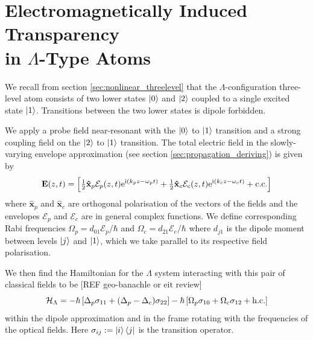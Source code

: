 \section[Electromagnetically Induced Transparency in $\Lambda$-Type Atoms]
  {Electromagnetically Induced Transparency\\ in $\Lambda$-Type Atoms}
  \label{sec:polaritons_eit}

    We recall from section \ref{sec:nonlinear_threelevel} that the
    $\Lambda$-configuration three-level atom consists of two lower states
    $\Ket{0}$ and $\Ket{2}$ coupled to a single excited state $\Ket{1}$.
    Transitions between the two lower states is dipole forbidden.

    We apply a probe field near-resonant with the $\Ket{0}$ to $\Ket{1}$
    transition and a strong coupling field on the $\Ket{2}$ to $\Ket{1}$
    transition. The total electric field in the slowly-varying envelope
    approximation (see section \ref{sec:propagation_deriving}) is given by 
    \begin{equation}
      \mathbf{E}(z,t) = \left[ \tfrac{1}{2} \mathbf{\hat{x}}_p 
        \mathcal{E}_p(z,t) \mathrm{e}^{\mathrm{i}(k_p z - \omega_p t)} + 
        \tfrac{1}{2} \mathbf{\hat{x}}_c \mathcal{E}_c(z,t) \mathrm{e}^{\mathrm{i}(k_c z -
        \omega_c t)} + \mathrm{c.c.} \right]
      \label{eqn:lambda_field}
    \end{equation}
   where $\mathbf{\hat{x}}_p$ and $\mathbf{\hat{x}}_c$ are orthogonal
    polarisation of the vectors of the fields and the envelopes $\mathcal{E}_p$
    and $\mathcal{E}_c$ are in general complex functions. We define
    corresponding Rabi frequencies $\Omega_p = d_{01}\mathcal{E}_p/\hbar$ and
    $\Omega_c = d_{21}\mathcal{E}_c/\hbar$ where $d_{j1}$ is the dipole moment
    between levels $\Ket{j}$ and $\Ket{1}$, which we take parallel to its
    respective field polarisation.

    We then find the Hamiltonian for the $\Lambda$ system interacting with this
    pair of classical fields to be [REF geo-banachle or eit review]
    \begin{equation}
      \mathcal{H}_\mathrm{\Lambda} = -\hbar \left[ \Delta_p \sigma_{11} + 
        (\Delta_p - \Delta_c) \sigma_{22} \right] - \hbar \left[ \Omega_p 
        \sigma_{10} + \Omega_c \sigma_{12} + \mathrm{h.c.} \right]
      \label{eqn:lamda_hamiltonian}
    \end{equation}
    within the dipole approximation and in the frame rotating with the
    frequencies of the optical fields. Here $\sigma_{ij} := \Ket{i}\Bra{j}$ is
    the transition operator.

